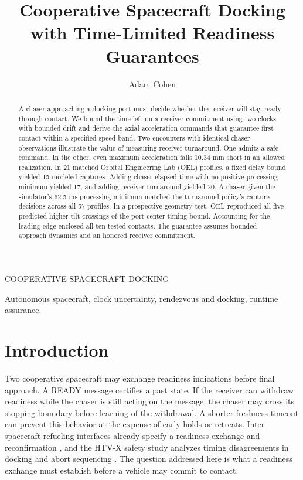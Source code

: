 \documentclass{IEEEtaes}
\makeatletter
\let\taesproductionmaketitle\maketitle
\renewcommand{\maketitle}{%
  \let\taesproductionfootnotetext\footnotetext
  \renewcommand{\footnotetext}[1]{\taesproductionfootnotetext{\noindent\@corresp}}%
  \taesproductionmaketitle
  \let\footnotetext\taesproductionfootnotetext
}
\makeatother
\begin{document}
\pagestyle{taesreview}

\title{Cooperative Spacecraft Docking with Time-Limited Readiness Guarantees}
\author{Adam Cohen}
{COOPERATIVE SPACECRAFT DOCKING}
\maketitle
\thispagestyle{taesreview}

\begin{abstract}
A chaser approaching a docking port must decide whether the receiver will stay ready through contact. We bound the time left on a receiver commitment using two clocks with bounded drift and derive the axial acceleration commands that guarantee first contact within a specified speed band. Two encounters with identical chaser observations illustrate the value of measuring receiver turnaround. One admits a safe command. In the other, even maximum acceleration falls 10.34 mm short in an allowed realization. In 21 matched Orbital Engineering Lab (OEL) profiles, a fixed delay bound yielded 15 modeled captures. Adding chaser elapsed time with no positive processing minimum yielded 17, and adding receiver turnaround yielded 20. A chaser given the simulator's 62.5 ms processing minimum matched the turnaround policy's capture decisions across all 57 profiles. In a prospective geometry test, OEL reproduced all five predicted higher-tilt crossings of the port-center timing bound. Accounting for the leading edge enclosed all ten tested contacts. The guarantee assumes bounded approach dynamics and an honored receiver commitment.
\end{abstract}

\begin{IEEEkeywords}
Autonomous spacecraft, clock uncertainty, rendezvous and docking, runtime assurance.
\end{IEEEkeywords}

\section{Introduction}

Two cooperative spacecraft may exchange readiness indications before final approach. A READY message certifies a past state. If the receiver can withdraw readiness while the chaser is still acting on the message, the chaser may cross its stopping boundary before learning of the withdrawal. A shorter freshness timeout can prevent this behavior at the expense of early holds or retreats. Inter-spacecraft refueling interfaces already specify a readiness exchange and reconfirmation \cite{ior}, and the HTV-X safety study analyzes timing disagreements in docking and abort sequencing \cite{htvx}. The question addressed here is what a readiness exchange must establish before a vehicle may commit to contact.
\end{document}
